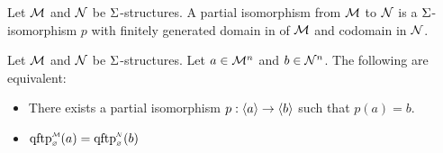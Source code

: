 \begin{dfn}
    Let $\mathcal{M}$ and $\mathcal{N}$ be $\Sigma$-structures.
    A partial isomorphism from $\mathcal{M}$ to $\mathcal{N}$ is a $\Sigma$-isomorphism $p$
    with finitely generated domain in of $\mathcal{M}$ 
    and codomain in $\mathcal{N}$.
\end{dfn}

\begin{prop}
    Let $\mathcal{M}$ and $\mathcal{N}$ be $\Sigma$-structures. 
    Let $a \in \mathcal{M}^n$ and $b \in \mathcal{N}^n$.
    The following are equivalent:
    \begin{itemize}
        \item There exists a partial isomorphism $p : \langle a\rangle \to \langle b\rangle$ 
            such that $p(a) = b$.
        \item $\subintp{\nothing}{\MM}{\qftp}(a) = 
            \subintp{\nothing}{\NN}{\qftp}(b)$
    \end{itemize}
\end{prop}
